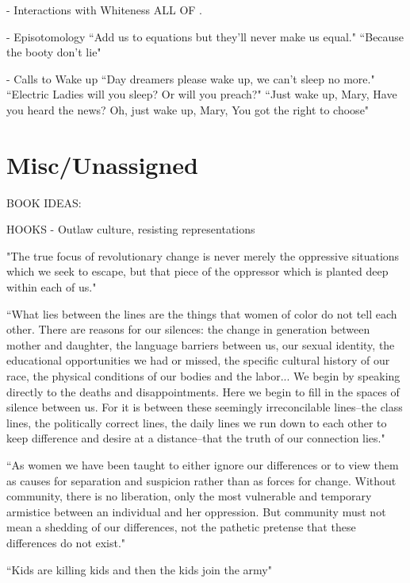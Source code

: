 \documentclass[a4paper, 11pt]{article} %
\begin{document}
- Interactions with Whiteness
ALL OF \cite{favoritefugitive}.

- Episotomology
``Add us to equations but they'll never make us equal." \cite{queen}
``Because the booty don't lie" \cite{queen}

- Calls to Wake up
``Day dreamers please wake up, we can't sleep no more." \cite{sincerelyjane}
``Electric Ladies will you sleep? Or will you preach?" \cite{queen}
``Just wake up, Mary, Have you heard the news? Oh, just wake up, Mary, You got the right to choose" \cite{sallyride}




\section*{Misc/Unassigned}

BOOK IDEAS:

HOOKS - Outlaw culture, resisting representations

"The true focus of revolutionary change is never merely the oppressive situations which we seek to escape, but that piece of the oppressor which is planted deep within each of us." \cite{lordredefiningdifference} 

``What lies between the lines are the things that women of color do not tell each other. There are reasons for our silences: the change in generation between mother and daughter, the language barriers between us, our sexual identity, the educational opportunities we had or missed, the specific cultural history of our race, the physical conditions of our bodies and the labor... We begin by speaking directly to the deaths and disappointments. Here we begin to fill in the spaces of silence between us. For it is between these seemingly irreconcilable lines--the class lines, the politically correct lines, the daily lines we run down to each other to keep difference and desire at a distance--that the truth of our connection lies." \cite{thebridge}

``As women we have been taught to either ignore our differences or to view them as causes for separation and suspicion rather than as forces for change. Without community, there is no liberation, only the most vulnerable and temporary armistice between an individual and her oppression. But community must not mean a shedding of our differences, not the pathetic pretense that these differences do not exist." \cite{lorde2003master}

``Kids are killing kids and then the kids join the army" \cite{danceordie}
\end{document}
